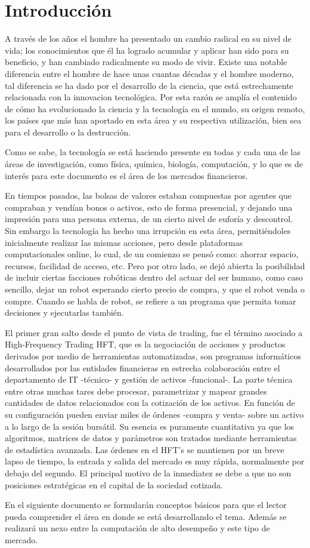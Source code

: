 \section{Introducción}
A través de los años el hombre ha presentado un cambio radical en su nivel de vida; los conocimientos que él ha logrado acumular y aplicar han sido para su beneficio, 
y han cambiado radicalmente su modo de vivir. Existe una notable diferencia entre el hombre de hace unas cuantas décadas y el hombre moderno, tal diferencia se ha 
dado por el desarrollo de la ciencia, que está estrechamente relacionada con la innovacion tecnológica. Por esta razón se amplía el contenido de cómo ha 
evolucionado la ciencia y la tecnología en el mundo, su origen remoto, los países que más han aportado en esta área y su respectiva utilización, bien sea para 
el desarrollo o la destrucción.

Como se sabe, la tecnología se está haciendo presente en todas y cada una de las áreas de investigación, como física, química, biología, computación, y lo que es de 
interés para este documento es el área de los mercados financieros.

En tiempos pasados, las bolsas de valores estaban compuestas por agentes que compraban y vendían bonos o activos, esto de forma presencial, y dejando una impresión 
para una persona externa, de un cierto nivel de euforía y descontrol. Sin embargo la tecnología ha hecho una irrupción en esta área, permitiéndoles inicialmente
realizar las mismas acciones, pero desde plataformas computacionales online, lo cual, de un comienzo se pensó como: ahorrar espacio, recursos, facilidad de acceso, etc.
Pero por otro lado, se dejó abierta la posibilidad de incluir ciertas facciones robóticas dentro del actuar del ser humano, como caso sencillo, dejar un robot esperando
cierto precio de compra, y que el robot venda o compre. Cuando se habla de robot, se refiere a un programa que permita tomar decisiones y ejecutarlas también.

El primer gran salto desde el punto de vista de trading, fue el término asociado a High-Frequency Trading HFT, que es la negociación de acciones y productos derivados 
por medio de herramientas automatizadas, son programas informáticos desarrollados por las entidades financieras en estrecha colaboración entre el departamento de 
IT -técnico- y gestión de activos -funcional-.  La parte técnica entre otras muchas tares debe procesar, parametrizar y mapear grandes cantidades de datos 
relacionados con la cotización de los activos. En función de su configuración pueden enviar miles de órdenes -compra y venta- sobre un activo a lo largo de la sesión 
bursátil. Su esencia es puramente cuantitativa ya que los algoritmos, matrices de datos y parámetros son tratados mediante herramientas de estadística avanzada.  
Las órdenes en el HFT's se mantienen por un breve lapso de tiempo, la entrada y salida del mercado es muy rápida, normalmente por debajo del segundo. El principal 
motivo de la inmediatez se debe a que no son posiciones estratégicas en el capital de la sociedad cotizada.

En el siguiente documento se formularán conceptos básicos para que el lector pueda comprender el área en donde se está desarrollando el tema. Además se realizará
un nexo entre la computación de alto desempeño y este tipo de mercado.
